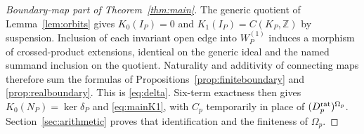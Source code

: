 \documentclass[11pt]{article}
\newcommand{\Z}{\mathbb Z}
\theoremstyle{definition}
\theoremstyle{remark}
\begin{document}
\begin{proof}[Boundary-map part of Theorem~\ref{thm:main}]
The generic quotient of Lemma~\ref{lem:orbits} gives $K_0(I_P)=0$ and $K_1(I_P)=C(K_P,\Z)$ by suspension. Inclusion of each invariant open edge into $W_P^{(1)}$ induces a morphism of crossed-product extensions, identical on the generic ideal and the named summand inclusion on the quotient. Naturality and additivity of connecting maps therefore sum the formulas of Propositions~\ref{prop:finiteboundary} and \ref{prop:realboundary}. This is \eqref{eq:delta}. Six-term exactness \citep[Theorem 9.3.1, pp.~67--68]{Blackadar} then gives $K_0(N_P)=\ker\delta_P$ and \eqref{eq:mainK1}, with $C_p$ temporarily in place of $(D_p^{\rm rat})^{\Omega_p}$. Section~\ref{sec:arithmetic} proves that identification and the finiteness of $\Omega_p$.
\end{proof}
\end{document}
